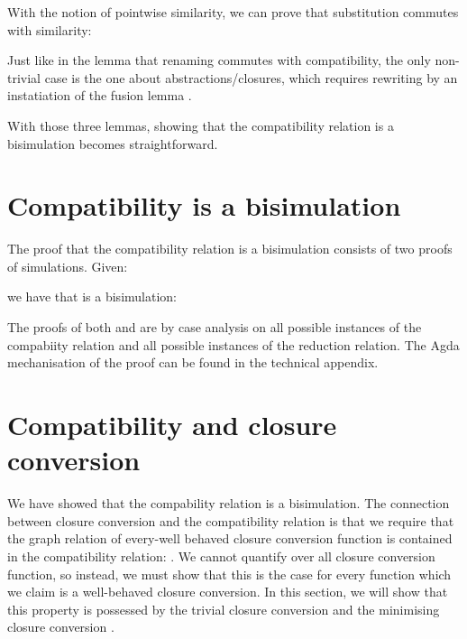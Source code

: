 \documentclass[bsc,frontabs,oneside,singlespacing,parskip,deptreport]{infthesis}
\theoremstyle{definition}
\theoremstyle{lemma}
\begin{document}

With the notion of pointwise similarity, we can prove that
substitution commutes with similarity:


Just like in the lemma that renaming commutes with compatibility, the
only non-trivial case is the one about abstractions/closures, which
requires rewriting by an instatiation of the fusion lemma
.


With those three lemmas, showing that the compatibility relation is a
bisimulation becomes straightforward.

\section{Compatibility is a bisimulation}
\label{sec:comp-relat-bisim}

The proof that the compatibility relation \AS{\ti} is a bisimulation
consists of two proofs of simulations. Given:

\noindent
\begin{minipage}{.5\textwidth}
\end{minipage}%
\begin{minipage}{.5\textwidth}
\end{minipage}

we have that \AS{\ti} is a bisimulation:


The proofs of both  and  are by case analysis on
all possible instances of the compabiity relation \AS{\ti} and all
possible instances of the reduction relation. The Agda mechanisation
of the proof can be found in the technical appendix.

\section{Compatibility and closure conversion}
\label{sec:comp-relat-clos}

We have showed that the compability relation is a bisimulation. The
connection between closure conversion and the compatibility relation
is that we require that the graph relation of every-well behaved
closure conversion function  is contained in the compatibility
relation: . We cannot quantify over all closure conversion function, so
instead, we must show that this is the case for every function which
we claim is a well-behaved closure conversion. In this section, we
will show that this property is possessed by the trivial closure
conversion  and the minimising closure conversion
.
\end{document}
